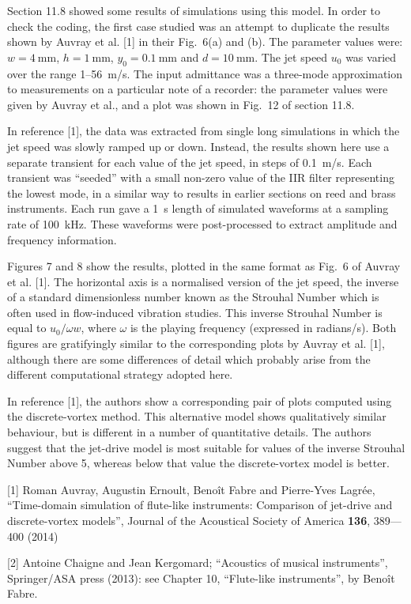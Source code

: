   Section 11.8 showed some results of simulations using this model. In order to 
  check the coding, the first case studied was an attempt to duplicate the 
  results shown by Auvray et al. [1] in their Fig.\ 6(a) and (b). The parameter 
  values were: $w=4 \mathrm{~mm}$, $h=1 \mathrm{~mm}$, $y_0=0.1 \mathrm{~mm}$ 
  and $d=10 \mathrm{~mm}$. The jet speed $u_0$ was varied over the range 
  1--56~m/s. The input admittance was a three-mode approximation to 
  measurements on a particular note of a recorder: the parameter values were 
  given by Auvray et al., and a plot was shown in Fig.\ 12 of section 11.8. 

  In reference [1], the data was extracted from single long simulations in 
  which the jet speed was slowly ramped up or down. Instead, the results shown 
  here use a separate transient for each value of the jet speed, in steps of 
  0.1~m/s. Each transient was ``seeded'' with a small non-zero value of the IIR 
  filter representing the lowest mode, in a similar way to results in earlier 
  sections on reed and brass instruments. Each run gave a 1~s length of 
  simulated waveforms at a sampling rate of 100~kHz. These waveforms were 
  post-processed to extract amplitude and frequency information. 

  Figures 7 and 8 show the results, plotted in the same format as Fig.\ 6 of 
  Auvray et al. [1]. The horizontal axis is a normalised version of the jet 
  speed, the inverse of a standard dimensionless number known as the Strouhal 
  Number which is often used in flow-induced vibration studies. This inverse 
  Strouhal Number is equal to $u_0/\omega w$, where $\omega$ is the playing 
  frequency (expressed in radians/s). Both figures are gratifyingly similar to 
  the corresponding plots by Auvray et al. [1], although there are some 
  differences of detail which probably arise from the different computational 
  strategy adopted here. 

  In reference [1], the authors show a corresponding pair of plots computed 
  using the discrete-vortex method. This alternative model shows qualitatively 
  similar behaviour, but is different in a number of quantitative details. The 
  authors suggest that the jet-drive model is most suitable for values of the 
  inverse Strouhal Number above 5, whereas below that value the discrete-vortex 
  model is better. 

  \sectionreferences{}[1] Roman Auvray, Augustin Ernoult, Benoît Fabre and 
  Pierre-Yves Lagrée, “Time-domain simulation of flute-like instruments: 
  Comparison of jet-drive and discrete-vortex models”, Journal of the 
  Acoustical Society of America \textbf{136}, 389—400 (2014) 

  [2] Antoine Chaigne and Jean Kergomard; “Acoustics of musical instruments”, 
  Springer/ASA press (2013): see Chapter 10, ``Flute-like instruments'', by 
  Benoît Fabre. 